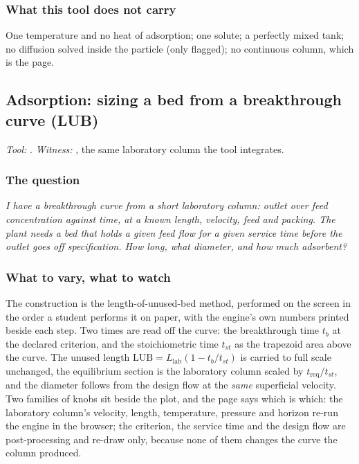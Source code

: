 \documentclass[11pt,a4paper]{article}
\begin{document}
\subsubsection*{What this tool does not carry}

One temperature and no heat of adsorption; one solute; a perfectly mixed
tank; no diffusion solved inside the particle (only flagged); no
continuous column, which is the  page.

\subsection{Adsorption: sizing a bed from a breakthrough curve (LUB)}\label{sec:edu-lub-scaleup}


\noindent\textit{\small Tool:} .  \textit{\small
Witness:} , the
same laboratory column the  tool integrates.

\subsubsection*{The question}

\emph{I have a breakthrough curve from a short laboratory column: outlet
over feed concentration against time, at a known length, velocity, feed
and packing.  The plant needs a bed that holds a given feed flow for a
given service time before the outlet goes off specification.  How long,
what diameter, and how much adsorbent?}

\subsubsection*{What to vary, what to watch}

The construction is the length-of-unused-bed method, performed on the
screen in the order a student performs it on paper, with the engine's own
numbers printed beside each step.  Two times are read off the curve: the
breakthrough time $t_b$ at the declared criterion, and the stoichiometric
time $t_{st}$ as the trapezoid area above the curve.  The unused length
$\mathrm{LUB} = L_{\mathrm{lab}}(1 - t_b/t_{st})$ is carried to full scale
unchanged, the equilibrium section is the laboratory column scaled by
$t_{\mathrm{req}}/t_{st}$, and the diameter follows from the design flow
at the \emph{same} superficial velocity.  Two families of knobs sit beside
the plot, and the page says which is which: the laboratory column's
velocity, length, temperature, pressure and horizon re-run the engine in
the browser; the criterion, the service time and the design flow are
post-processing and re-draw only, because none of them changes the curve
the column produced.
\end{document}
